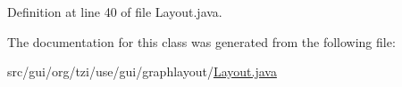 Definition at line 40 of file Layout.\-java.



The documentation for this class was generated from the following file\-:\begin{DoxyCompactItemize}
\item 
src/gui/org/tzi/use/gui/graphlayout/\hyperlink{_layout_8java}{Layout.\-java}\end{DoxyCompactItemize}
